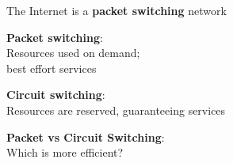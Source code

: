 \documentclass[20pt,handout,notes=show]{beamer}
\begin{document}
\begin{frame}[plain]\begin{center}
\end{center}\end{frame}

\begin{frame}\begin{center}\large
The Internet is a \textbf{packet switching} network
\end{center}\end{frame}

\begin{frame}\begin{center}\large
\textbf{Packet switching}:\\\large Resources used on demand;\\best effort services
\end{center}\end{frame}

\begin{frame}\begin{center}\large
\textbf{Circuit switching}:\\\large Resources are reserved, guaranteeing services
\end{center}\end{frame}

\begin{frame}\begin{center}\large
\textbf{Packet vs Circuit Switching}:\\\large Which is more efficient?
\end{center}\end{frame}
\end{document}
